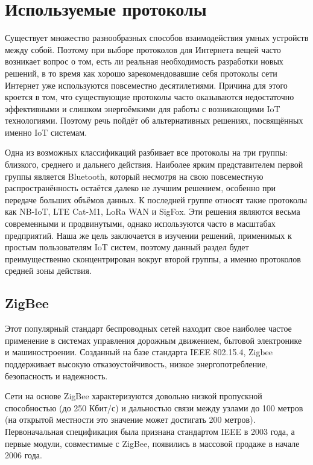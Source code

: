 	
	\section{Используемые протоколы}
	
	Существует множество разнообразных способов взаимодействия умных устройств между собой. Поэтому
	при выборе протоколов для Интернета вещей часто возникает вопрос о том, есть ли реальная необходимость
	разработки новых решений, в то время как хорошо зарекомендовавшие себя протоколы сети Интернет уже
	используются повсеместно десятилетиями. Причина для этого кроется в том, что существующие протоколы
	часто оказываются недостаточно эффективными и слишком энергоёмкими для работы с возникающими
	IoT технологиями. Поэтому речь пойдёт об альтернативных решениях, посвящённых именно IoT системам.
	
	Одна из возможных классификаций разбивает все протоколы на три группы: близкого, среднего и дальнего
	действия. Наиболее ярким представителем первой группы является Bluetooth, который несмотря на свою
	повсеместную распространённость остаётся далеко не лучшим решением, особенно при передаче больших
	объёмов данных. К последней группе относят такие протоколы как NB-IoT, LTE Cat-M1, LoRa WAN и SigFox.
	Эти решения являются весьма современными и продвинутыми, однако используются часто в масштабах
	предприятий. Наша же цель заключается в изучении решений, применимых к простым пользователям 
	IoT систем, поэтому данный раздел будет преимущественно сконцентрирован вокруг второй группы, 
	а именно протоколов средней зоны действия.
	
	
	

	\subsection{ZigBee}
	Этот популярный стандарт беспроводных сетей находит свое наиболее частое применение в системах 
	управления дорожным движением, бытовой электронике и машиностроении. Созданный на базе стандарта
	IEEE 802.15.4, Zigbee поддерживает высокую отказоустойчивость, низкое энергопотребление, безопасность
	и надежность.
	
	Сети на основе ZigBee характеризуются довольно низкой пропускной способностью (до 250 Кбит/с) и
	дальностью связи между узлами до 100 метров (на открытой местности это значение может достигать
	200 метров). Первоначальная спецификация была признана стандартом IEEE в 2003 года, а первые модули,
	совместимые с ZigBee, появились в массовой продаже в начале 2006 года.
	
